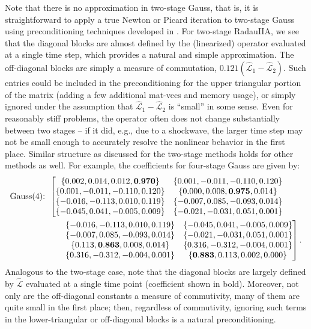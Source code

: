 \documentclass[review]{siamart}
\begin{document}
Note that there is no approximation in two-stage Gauss, that is, it is
straightforward to apply a true Newton or Picard iteration to two-stage
Gauss using preconditioning techniques developed in .
For two-stage RadauIIA, we see that the diagonal blocks are almost
defined by the (linearized) operator evaluated at a single time step, which
provides a natural and simple approximation. The off-diagonal blocks are
simply a measure of commutation, $0.121(\widehat{\mathcal{L}}_1 - \widehat{\mathcal{L}}_2)$.
Such entries could be included in the preconditioning for the upper
triangular portion of the matrix (adding a few additional mat-vecs and
memory usage), or simply ignored under the assumption that $\widehat{\mathcal{L}}_1 -
\widehat{\mathcal{L}}_2$ is ``small'' in some sense. Even for reasonably stiff 
problems, the operator often does not change substantially between
two stages -- if it did, e.g., due to a shockwave, the larger time step
may not be small enough to accurately resolve the nonlinear behavior in
the first place. Similar structure as discussed for the two-stage methods
holds for other methods as well. For example, the coefficients for four-stage
Gauss are given by:
%
\begin{align*}
\textnormal{Gauss(4):}& \hspace{1ex}
\left[\begin{matrix}
\{0.002,0.014,0.012,\mathbf{0.970}\} & \{0.001,-0.011,-0.110,0.120\} \\
\{0.001,-0.011,-0.110,0.120\} & \{0.000,0.008,\mathbf{0.975},0.014\} \\
\{-0.016,-0.113,0.010,0.119\} & \{-0.007,0.085,-0.093,0.014\} \\
\{-0.045,0.041,-0.005,0.009\} & \{-0.021,-0.031,0.051,0.001\}
\end{matrix}\right.
\\&\hspace{5ex}
\left.\begin{matrix}
\{-0.016,-0.113,0.010,0.119\} & \{-0.045,0.041,-0.005,0.009\}\\
\{-0.007,0.085,-0.093,0.014\} & \{-0.021,-0.031,0.051,0.001\}\\
\{0.113,\mathbf{0.863},0.008,0.014\} & \{0.316,-0.312,-0.004,0.001\}\\
\{0.316,-0.312,-0.004,0.001\} & \{\mathbf{0.883},0.113,0.002,0.000\}\\
\end{matrix}\right].
\end{align*}
%
Analogous to the two-stage case, note that the diagonal blocks are largely
defined by $\widehat{\mathcal{L}}$ evaluated at a single time point (coefficient
shown in bold). Moreover, not only are the off-diagonal constants
a measure of commutivity, many of them are quite small in the first place;
then, regardless of commutivity, ignoring such terms in the lower-triangular
or off-diagonal blocks is a natural preconditioning. 
\end{document}
